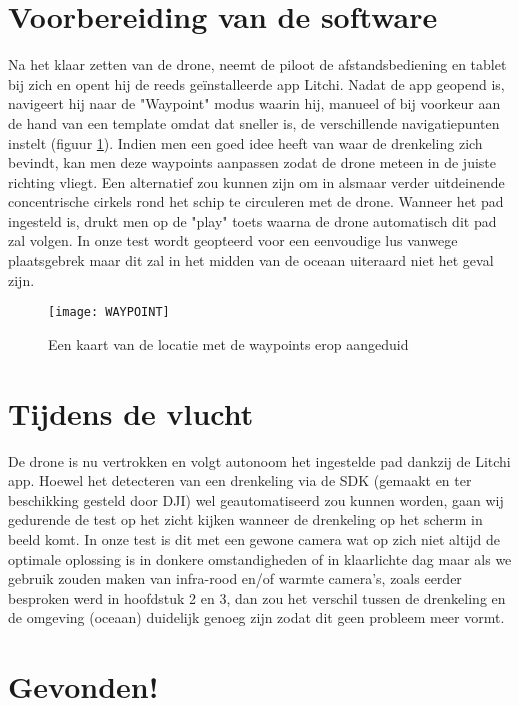 \newpage
\section{Voorbereiding van de software}

Na het klaar zetten van de drone, neemt de piloot de afstandsbediening en tablet bij zich en opent hij de reeds geïnstalleerde app Litchi. Nadat de app geopend is, navigeert hij naar de "Waypoint" modus waarin hij, manueel of bij voorkeur aan de hand van een template omdat dat sneller is, de verschillende navigatiepunten instelt (figuur \ref{waypoint}). Indien men een goed idee heeft van waar de drenkeling zich bevindt, kan men deze waypoints aanpassen zodat de drone meteen in de juiste richting vliegt. Een alternatief zou kunnen zijn om in alsmaar verder uitdeinende concentrische cirkels rond het schip te circuleren met de drone. Wanneer het pad ingesteld is, drukt men op de "play" toets waarna de drone automatisch dit pad zal volgen. In onze test wordt geopteerd voor een eenvoudige lus vanwege plaatsgebrek maar dit zal in het midden van de oceaan uiteraard niet het geval zijn. 

\begin{figure}[h]
	\centering
	\texttt{[image: WAYPOINT]}
	\caption{Een kaart van de locatie met de waypoints erop aangeduid}
	\label{waypoint}
\end{figure}


\section{Tijdens de vlucht}

De drone is nu vertrokken en volgt autonoom het ingestelde pad dankzij de Litchi app. Hoewel het detecteren van een drenkeling via de SDK (gemaakt en ter beschikking gesteld door DJI) wel geautomatiseerd zou kunnen worden, gaan wij gedurende de test op het zicht kijken wanneer de drenkeling op het scherm in beeld komt. In onze test is dit met een gewone camera wat op zich niet altijd de optimale oplossing is in donkere omstandigheden of in klaarlichte dag maar als we gebruik zouden maken van infra-rood en/of warmte camera's, zoals eerder besproken werd in hoofdstuk 2 en 3, dan zou het verschil tussen de drenkeling en de omgeving (oceaan) duidelijk genoeg zijn zodat dit geen probleem meer vormt.

\section{Gevonden!}

